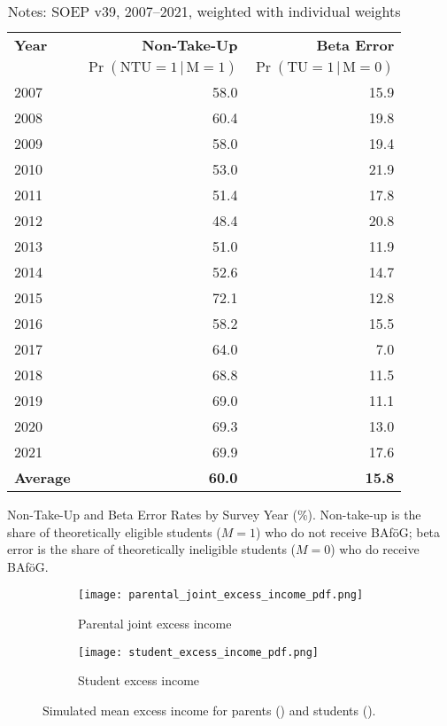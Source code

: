 \begin{table}[htbp]
\centering
\begin{tabular}{l@{\hspace{2em}}r@{\hspace{2em}}r}
\toprule
\textbf{Year} & \textbf{Non-Take-Up}  &  \textbf{Beta Error}  \\
              & \(\Pr(\text{NTU} =1\,|\,\text{M} = 1)\) & \(\Pr(\text{TU} = 1\,|\,\text{M} = 0)\) \\
\midrule
2007 & 58.0 & 15.9 \\
2008 & 60.4 & 19.8 \\
2009 & 58.0 & 19.4 \\
2010 & 53.0 & 21.9 \\
2011 & 51.4 & 17.8 \\
2012 & 48.4 & 20.8 \\
2013 & 51.0 & 11.9 \\
2014 & 52.6 & 14.7 \\
2015 & 72.1 & 12.8 \\
2016 & 58.2 & 15.5 \\
2017 & 64.0 & 7.0 \\
2018 & 68.8 & 11.5 \\
2019 & 69.0 & 11.1 \\
2020 & 69.3 & 13.0 \\
2021 & 69.9 & 17.6 \\
\midrule
\textbf{Average} & \textbf{60.0} & \textbf{15.8} \\
\bottomrule
\end{tabular}
\caption{Non-Take-Up and Beta Error Rates by Survey Year (\%). Non-take-up is the share of theoretically eligible students (\(M=1\)) who do not receive BAföG; beta error is the share of theoretically ineligible students (\(M=0\)) who do receive BAföG.}
\caption*{\small{Notes: SOEP v39, 2007--2021, weighted with individual weights}}
\label{table:microsimulation-ntu}
\end{table}


\begin{figure}[htbp]
  \centering
  \begin{subfigure}[t]{0.48\linewidth}
    \texttt{[image: parental\_joint\_excess\_income\_pdf.png]}
    \caption{Parental joint excess income}
    \label{fig:parental-excess}
  \end{subfigure}
  \hfill
  \begin{subfigure}[t]{0.48\linewidth}
    \texttt{[image: student\_excess\_income\_pdf.png]}
    \caption{Student excess income}
    \label{fig:student-excess}
  \end{subfigure}
  \caption{Simulated mean excess income for parents () and students ().}
  \label{fig:excess-income}
\end{figure}

